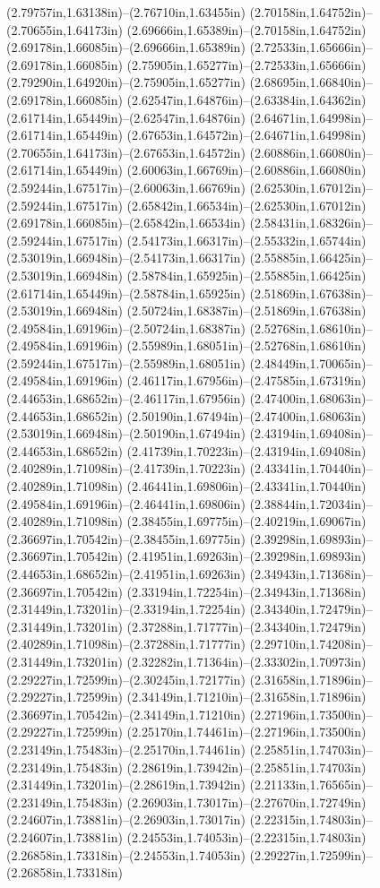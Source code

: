 (2.79757in,1.63138in)--(2.76710in,1.63455in) (2.70158in,1.64752in)--(2.70655in,1.64173in) (2.69666in,1.65389in)--(2.70158in,1.64752in) (2.69178in,1.66085in)--(2.69666in,1.65389in) (2.72533in,1.65666in)--(2.69178in,1.66085in) (2.75905in,1.65277in)--(2.72533in,1.65666in) (2.79290in,1.64920in)--(2.75905in,1.65277in) (2.68695in,1.66840in)--(2.69178in,1.66085in) (2.62547in,1.64876in)--(2.63384in,1.64362in) (2.61714in,1.65449in)--(2.62547in,1.64876in) (2.64671in,1.64998in)--(2.61714in,1.65449in) (2.67653in,1.64572in)--(2.64671in,1.64998in) (2.70655in,1.64173in)--(2.67653in,1.64572in) (2.60886in,1.66080in)--(2.61714in,1.65449in) (2.60063in,1.66769in)--(2.60886in,1.66080in) (2.59244in,1.67517in)--(2.60063in,1.66769in) (2.62530in,1.67012in)--(2.59244in,1.67517in) (2.65842in,1.66534in)--(2.62530in,1.67012in) (2.69178in,1.66085in)--(2.65842in,1.66534in) (2.58431in,1.68326in)--(2.59244in,1.67517in) (2.54173in,1.66317in)--(2.55332in,1.65744in) (2.53019in,1.66948in)--(2.54173in,1.66317in) (2.55885in,1.66425in)--(2.53019in,1.66948in) (2.58784in,1.65925in)--(2.55885in,1.66425in) (2.61714in,1.65449in)--(2.58784in,1.65925in) (2.51869in,1.67638in)--(2.53019in,1.66948in) (2.50724in,1.68387in)--(2.51869in,1.67638in) (2.49584in,1.69196in)--(2.50724in,1.68387in) (2.52768in,1.68610in)--(2.49584in,1.69196in) (2.55989in,1.68051in)--(2.52768in,1.68610in) (2.59244in,1.67517in)--(2.55989in,1.68051in) (2.48449in,1.70065in)--(2.49584in,1.69196in) (2.46117in,1.67956in)--(2.47585in,1.67319in) (2.44653in,1.68652in)--(2.46117in,1.67956in) (2.47400in,1.68063in)--(2.44653in,1.68652in) (2.50190in,1.67494in)--(2.47400in,1.68063in) (2.53019in,1.66948in)--(2.50190in,1.67494in) (2.43194in,1.69408in)--(2.44653in,1.68652in) (2.41739in,1.70223in)--(2.43194in,1.69408in) (2.40289in,1.71098in)--(2.41739in,1.70223in) (2.43341in,1.70440in)--(2.40289in,1.71098in) (2.46441in,1.69806in)--(2.43341in,1.70440in) (2.49584in,1.69196in)--(2.46441in,1.69806in) (2.38844in,1.72034in)--(2.40289in,1.71098in) (2.38455in,1.69775in)--(2.40219in,1.69067in) (2.36697in,1.70542in)--(2.38455in,1.69775in) (2.39298in,1.69893in)--(2.36697in,1.70542in) (2.41951in,1.69263in)--(2.39298in,1.69893in) (2.44653in,1.68652in)--(2.41951in,1.69263in) (2.34943in,1.71368in)--(2.36697in,1.70542in) (2.33194in,1.72254in)--(2.34943in,1.71368in) (2.31449in,1.73201in)--(2.33194in,1.72254in) (2.34340in,1.72479in)--(2.31449in,1.73201in) (2.37288in,1.71777in)--(2.34340in,1.72479in) (2.40289in,1.71098in)--(2.37288in,1.71777in) (2.29710in,1.74208in)--(2.31449in,1.73201in) (2.32282in,1.71364in)--(2.33302in,1.70973in) (2.29227in,1.72599in)--(2.30245in,1.72177in) (2.31658in,1.71896in)--(2.29227in,1.72599in) (2.34149in,1.71210in)--(2.31658in,1.71896in) (2.36697in,1.70542in)--(2.34149in,1.71210in) (2.27196in,1.73500in)--(2.29227in,1.72599in) (2.25170in,1.74461in)--(2.27196in,1.73500in) (2.23149in,1.75483in)--(2.25170in,1.74461in) (2.25851in,1.74703in)--(2.23149in,1.75483in) (2.28619in,1.73942in)--(2.25851in,1.74703in) (2.31449in,1.73201in)--(2.28619in,1.73942in) (2.21133in,1.76565in)--(2.23149in,1.75483in) (2.26903in,1.73017in)--(2.27670in,1.72749in) (2.24607in,1.73881in)--(2.26903in,1.73017in) (2.22315in,1.74803in)--(2.24607in,1.73881in) (2.24553in,1.74053in)--(2.22315in,1.74803in) (2.26858in,1.73318in)--(2.24553in,1.74053in) (2.29227in,1.72599in)--(2.26858in,1.73318in) 